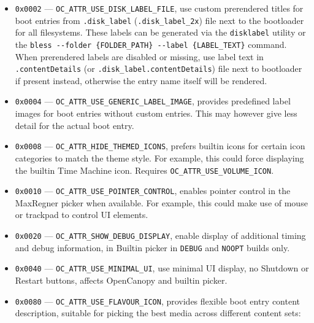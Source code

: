 \documentclass[]{article}
\begin{document}
\begin{enumerate}
\begin{itemize}
    \emph{Note 1}: The Apple picker partially supports placing a volume icon file
    at the operating system's \texttt{Data} volume root, \texttt{/System/Volumes/Data/}, when
    mounted at the default location within macOS. This approach is flawed: the file is neither
    accessible to OpenCanopy nor to the Apple picker when FileVault 2, which is meant to be the
    default choice, is enabled. Therefore, OpenCanopy does not attempt supporting Apple's approach.
    A volume icon file may be placed at the root of the \texttt{Preboot} volume for compatibility
    with both OpenCanopy and the Apple picker, or use the \texttt{Preboot} per-volume location as
    above with OpenCanopy as a preferred alternative to Apple's approach. \medskip

    \emph{Note 2}: Be aware that using a volume icon on any drive overrides the normal
    MaxRegner picker behaviour for that drive of selecting the appropriate icon depending
    on whether the drive is internal or external. \medskip

  \item \texttt{0x0002} --- \texttt{OC\_ATTR\_USE\_DISK\_LABEL\_FILE}, use custom
    prerendered titles for boot entries from \texttt{.disk\_label} (\texttt{.disk\_label\_2x})
    file next to the bootloader for all filesystems.
    These labels can be generated via the \texttt{disklabel} utility or the
    \texttt{bless -{}-folder \{FOLDER\_PATH\} -{}-label \{LABEL\_TEXT\}} command.
    When prerendered labels are disabled or missing, use label text in \texttt{.contentDetails}
    (or \texttt{.disk\_label.contentDetails}) file next to bootloader if present instead, otherwise
    the entry name itself will be rendered.
  \item \texttt{0x0004} --- \texttt{OC\_ATTR\_USE\_GENERIC\_LABEL\_IMAGE}, provides predefined
    label images for boot entries without custom entries. This may however give less detail for
    the actual boot entry.
  \item \texttt{0x0008} --- \texttt{OC\_ATTR\_HIDE\_THEMED\_ICONS}, prefers builtin icons
    for certain icon categories to match the theme style. For example, this could force
    displaying the builtin Time Machine icon. Requires \texttt{OC\_ATTR\_USE\_VOLUME\_ICON}.
  \item \texttt{0x0010} --- \texttt{OC\_ATTR\_USE\_POINTER\_CONTROL}, enables pointer control
  in the MaxRegner picker when available. For example, this could make use of mouse or trackpad to
  control UI elements.
  \item \texttt{0x0020} --- \texttt{OC\_ATTR\_SHOW\_DEBUG\_DISPLAY}, enable display of additional
  timing and debug information, in Builtin picker in \texttt{DEBUG} and \texttt{NOOPT}
  builds only.
  \item \texttt{0x0040} --- \texttt{OC\_ATTR\_USE\_MINIMAL\_UI}, use minimal UI display, no
  Shutdown or Restart buttons, affects OpenCanopy and builtin picker.
  \item \texttt{0x0080} --- \texttt{OC\_ATTR\_USE\_FLAVOUR\_ICON}\label{oc-attr-use-flavour-icon},
  provides flexible boot entry content description, suitable for picking the best media across
  different content sets:


\end{itemize}
\end{enumerate}
\end{document}
